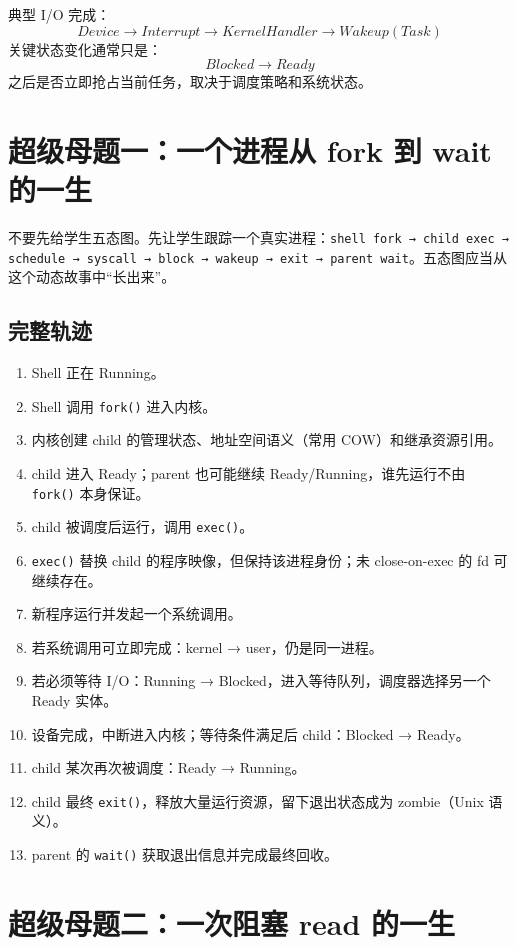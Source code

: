 \documentclass[11pt,a4paper]{ctexart}
\newcommand{\code}[1]{\texttt{#1}}
\begin{document}
典型 I/O 完成：
\[
Device\rightarrow Interrupt\rightarrow KernelHandler\rightarrow Wakeup(Task)
\]
关键状态变化通常只是：
\[
Blocked\rightarrow Ready
\]
之后是否立即抢占当前任务，取决于调度策略和系统状态。

\section{超级母题一：一个进程从 fork 到 wait 的一生}

\begin{corebox}[推荐课堂主线]
不要先给学生五态图。先让学生跟踪一个真实进程：\code{shell fork → child exec → schedule → syscall → block → wakeup → exit → parent wait}。五态图应当从这个动态故事中“长出来”。
\end{corebox}

\subsection{完整轨迹}

\begin{enumerate}
\item Shell 正在 Running。
\item Shell 调用 \code{fork()} 进入内核。
\item 内核创建 child 的管理状态、地址空间语义（常用 COW）和继承资源引用。
\item child 进入 Ready；parent 也可能继续 Ready/Running，谁先运行不由 \code{fork()} 本身保证。
\item child 被调度后运行，调用 \code{exec()}。
\item \code{exec()} 替换 child 的程序映像，但保持该进程身份；未 close-on-exec 的 fd 可继续存在。
\item 新程序运行并发起一个系统调用。
\item 若系统调用可立即完成：kernel → user，仍是同一进程。
\item 若必须等待 I/O：Running → Blocked，进入等待队列，调度器选择另一个 Ready 实体。
\item 设备完成，中断进入内核；等待条件满足后 child：Blocked → Ready。
\item child 某次再次被调度：Ready → Running。
\item child 最终 \code{exit()}，释放大量运行资源，留下退出状态成为 zombie（Unix 语义）。
\item parent 的 \code{wait()} 获取退出信息并完成最终回收。
\end{enumerate}

\section{超级母题二：一次阻塞 read 的一生}
\end{document}
